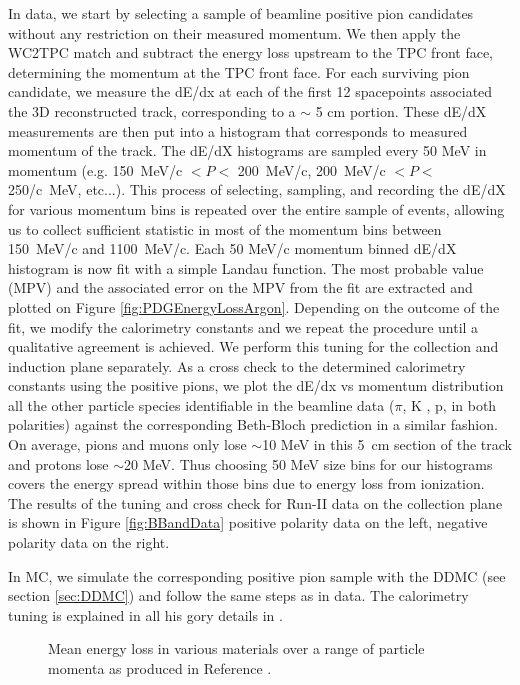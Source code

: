In data, we start by selecting a sample of beamline positive pion candidates without any restriction on their measured momentum.
We then apply the WC2TPC match and subtract the energy loss upstream to the TPC front face, determining the momentum at the TPC front face. For each surviving pion candidate,  we measure the dE/dx at each of the first 12 spacepoints associated the 3D reconstructed track, corresponding to a $\sim$ 5 cm portion. These dE/dX measurements are then put into a histogram that corresponds to measured momentum of the track. The dE/dX histograms are sampled every 50 MeV in momentum (e.g. 150~MeV/c $< P <$ 200~MeV/c, 200~MeV/c $< P <$ 250/c~MeV, etc...).   This process of selecting, sampling, and recording the dE/dX for various momentum bins is repeated over the entire sample of events, allowing us to collect sufficient statistic in most of the momentum bins between 150~MeV/c and 1100~MeV/c.
Each 50 MeV/c momentum binned dE/dX histogram is now fit with a simple Landau function. The most probable value (MPV) and the associated error on the MPV from the fit are extracted and plotted on Figure \ref{fig:PDGEnergyLossArgon}. Depending on the outcome of the fit, we modify the calorimetry constants and we repeat the procedure until a qualitative agreement is achieved.  We perform this  tuning for the collection and induction plane separately. 
As a cross check to the determined calorimetry constants using the positive pions, we plot the dE/dx vs momentum distribution all the other particle species identifiable in the beamline data ($\pi$, K , p, in both polarities) against the corresponding Beth-Bloch prediction in a similar fashion. On average, pions and muons only lose $\sim$10 MeV in this 5~cm section of the track and protons lose $\sim$20 MeV. Thus choosing 50 MeV size bins for our histograms covers the energy spread within those bins due to energy loss from ionization.  The results of the tuning and cross check for Run-II data on the collection plane is shown in Figure \ref{fig:BBandData} positive polarity data on the left, negative polarity data on the right.

In MC, we simulate the corresponding positive pion sample with the DDMC (see section \ref{sec:DDMC}) and follow the same steps as in data. The calorimetry tuning is explained in all his gory details in \cite{technote}.


\begin{figure}[htb]
\centering
\caption{Mean energy loss in various materials over a range of particle momenta as produced in Reference \cite{PDG}.}
\label{fig:PDGEnergyLoss}
\end{figure}


